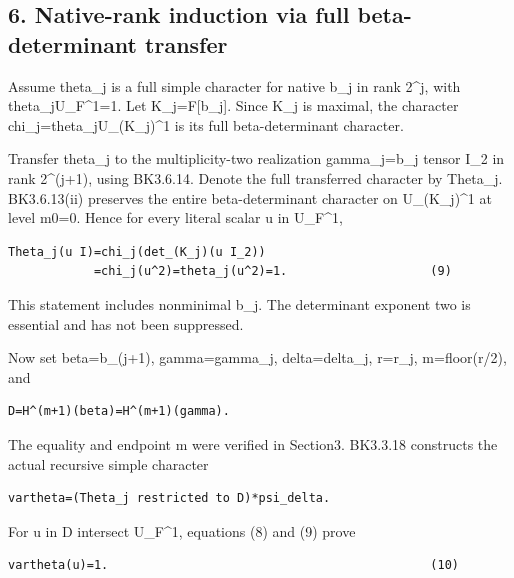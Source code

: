 \hypertarget{dyadic_character-native-rank-induction-via-full-beta-determinant-transfer}{%
\subsection{6. Native-rank induction via full beta-determinant
transfer}\label{dyadic_character-native-rank-induction-via-full-beta-determinant-transfer}}

Assume theta\_j is a full simple character for native b\_j in rank
2\^{}j, with theta\_j\textbar U\_F\^{}1=1. Let K\_j=F{[}b\_j{]}. Since
K\_j is maximal, the character chi\_j=theta\_j\textbar U\_(K\_j)\^{}1 is
its full beta-determinant character.

Transfer theta\_j to the multiplicity-two realization gamma\_j=b\_j
tensor I\_2 in rank 2\^{}(j+1), using BK3.6.14. Denote the full
transferred character by Theta\_j. BK3.6.13(ii) preserves the entire
beta-determinant character on U\_(K\_j)\^{}1 at level m0=0. Hence for
every literal scalar u in U\_F\^{}1,

\begin{Verbatim}[fontsize=\small,breaklines=true,breakanywhere=true]
Theta_j(u I)=chi_j(det_(K_j)(u I_2))
            =chi_j(u^2)=theta_j(u^2)=1.                    (9)
\end{Verbatim}

This statement includes nonminimal b\_j. The determinant exponent two is
essential and has not been suppressed.

Now set beta=b\_(j+1), gamma=gamma\_j, delta=delta\_j, r=r\_j,
m=floor(r/2), and

\begin{Verbatim}[fontsize=\small,breaklines=true,breakanywhere=true]
D=H^(m+1)(beta)=H^(m+1)(gamma).
\end{Verbatim}

The equality and endpoint m were verified in Section3. BK3.3.18
constructs the actual recursive simple character

\begin{Verbatim}[fontsize=\small,breaklines=true,breakanywhere=true]
vartheta=(Theta_j restricted to D)*psi_delta.
\end{Verbatim}

For u in D intersect U\_F\^{}1, equations (8) and (9) prove

\begin{Verbatim}[fontsize=\small,breaklines=true,breakanywhere=true]
vartheta(u)=1.                                             (10)
\end{Verbatim}

